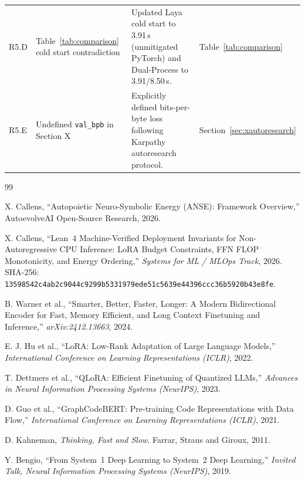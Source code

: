 \documentclass[conference]{IEEEtran}
\begin{document}
\begin{table}[htbp]
\begin{tabular}{@{}lp{4.2cm}p{5.8cm}p{4.2cm}@{}}
R5.D & Table~\ref{tab:comparison} cold start contradiction & Updated Laya cold start to 3.91\,s (unmitigated PyTorch) and Dual-Process to 3.91/8.50\,s. & Table~\ref{tab:comparison} \\
R5.E & Undefined \texttt{val\_bpb} in Section X & Explicitly defined bits-per-byte loss following Karpathy autoresearch protocol. & Section~\ref{sec:xautoresearch} \\
\bottomrule
\end{tabular}
\end{table}


\begin{thebibliography}{99}

X. Callens, ``Autopoietic Neuro-Symbolic Energy (ANSE): Framework Overview,''
AutoevolveAI Open-Source Research, 2026.

X. Callens, ``Lean~4 Machine-Verified Deployment Invariants for Non-Autoregressive CPU Inference:
LoRA Budget Constraints, FFN FLOP Monotonicity, and Energy Ordering,''
\emph{Systems for ML / MLOps Track}, 2026.
SHA-256: \texttt{13598542c4ab2c9044c9299b5331979ede51c5639e44396ccc36b5920b43e8fe}.

B. Warner et al., ``Smarter, Better, Faster, Longer: A Modern Bidirectional Encoder for
Fast, Memory Efficient, and Long Context Finetuning and Inference,''
\emph{arXiv:2412.13663}, 2024.

E. J. Hu et al., ``LoRA: Low-Rank Adaptation of Large Language Models,''
\emph{International Conference on Learning Representations (ICLR)}, 2022.

T. Dettmers et al., ``QLoRA: Efficient Finetuning of Quantized LLMs,''
\emph{Advances in Neural Information Processing Systems (NeurIPS)}, 2023.

D. Guo et al., ``GraphCodeBERT: Pre-training Code Representations with Data Flow,''
\emph{International Conference on Learning Representations (ICLR)}, 2021.

D. Kahneman, \emph{Thinking, Fast and Slow}. Farrar, Straus and Giroux, 2011.

Y. Bengio, ``From System~1 Deep Learning to System~2 Deep Learning,''
\emph{Invited Talk, Neural Information Processing Systems (NeurIPS)}, 2019.


\end{thebibliography}
\end{document}
